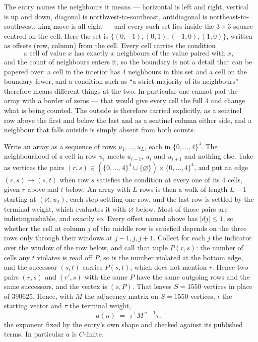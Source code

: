 \documentclass[11pt,a4paper]{article}
\theoremstyle{plain}
\theoremstyle{definition}
\begin{document}
The entry names the neighbours it means --- horizontal is left and right, vertical is up and
down, diagonal is northwest-to-southeast, antidiagonal is northeast-to-southwest, king-move is
all eight --- and every such set lies inside the $3\times3$ square centred on the cell. Here
the set is $\{(0,-1), (0,1), (-1,0), (1,0)\}$, written as offsets (row, column) from the cell. Every cell carries
the condition
\[
\text{a cell of value }x\text{ has exactly }x\text{ neighbours of the value paired with }x,
\]
and the count of neighbours enters it, so the boundary is not a detail that can be papered
over: a cell in the interior has $4$ neighbours in this set and a cell on the boundary
fewer, and a condition such as ``a strict majority of its neighbours'' therefore means
different things at the two. In particular one cannot pad the array with a border of zeros ---
that would give every cell the full $4$ and change what is being counted. The outside is
therefore carried
explicitly, as a sentinel row above the first and below the last and as a sentinel column
either side, and a neighbour that falls outside is simply absent from both counts.

Write an array as a sequence of rows $u_1,\dots,u_L$, each in
$\{0,\dots,4\}^{4}$. The neighbourhood of a cell in row $u_i$ meets $u_{i-1}$,
$u_i$ and $u_{i+1}$ and nothing else. Take as vertices the pairs
$(r,s)\in(\{0,\dots,4\}^{4}\cup\{\varnothing\})\times\{0,\dots,4\}^{4}$,
and put an edge $(r,s)\to(s,t)$ when row $s$ satisfies the condition at every one of its
$4$ cells, given $r$ above and $t$ below. An array with $L$ rows is then a walk of length
$L-1$ starting at $(\varnothing,u_1)$, each step settling one row, and the last row is
settled by the terminal weight, which evaluates it with $\varnothing$ below. Most of those pairs are indistinguishable, and exactly so. Every offset named above has $|dj|\le 1$, so whether the cell at column $j$ of the middle row is satisfied depends on the three rows only through their windows at $j-1,j,j+1$. Collect for each $j$ the indicator over the window of the row below, and call that tuple $P(r,s)$: the number of cells any $t$ violates is read off $P$, so is the number violated at the bottom edge, and the successor $(s,t)$ carries $P(s,t)$, which does not mention $r$. Hence two pairs $(r,s)$ and $(r',s)$ with the same $P$ have the same outgoing rows and the same successors, and the vertex is $(s,P)$. That leaves $S=1550$ vertices in place of $390625$. Hence,
with $M$ the adjacency matrix on $S=1550$ vertices, $\iota$ the starting vector and $\tau$ the
terminal weight,
\[
a(n)\;=\;\,\iota^{\!\top}M^{\,n-1}\tau ,
\]
the exponent fixed by the entry's own shape and checked against its published terms. In
particular $a$ is $C$-finite.
\end{document}
